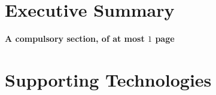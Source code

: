 \documentclass[ %
                    author={Alexander Dalton},
                supervisor={Prof. Seth Bullock},
                    degree={MEng},
                     title={Exploring Evolutionary Hardware and its Application to Dynamic Problems},
                  subtitle={},
                      type={research},
                      year={2018} ]{dissertation}
\begin{document}


\maketitle


\frontmatter


\makedecl


\tableofcontents
\listoffigures
\listoftables
\listofalgorithms
\lstlistoflistings



\chapter*{Executive Summary}

{\bf \color{red}A compulsory section, of at most $1$ page} 
\vspace{1cm} 




\chapter*{Supporting Technologies}
\end{document}

